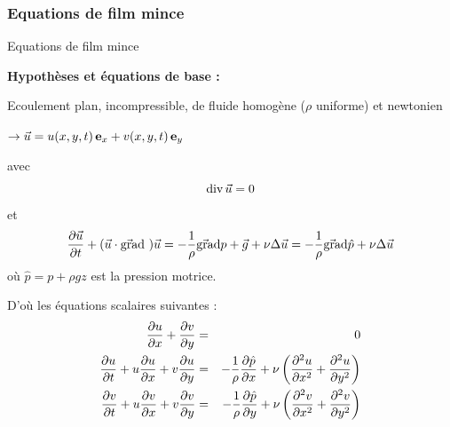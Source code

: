 \subsubsection{Equations de film mince}
\begin{frame}{Equations de film mince}

\small

\textbf{Hypothèses et équations de base :} \medskip

Ecoulement plan, incompressible, de fluide homogène ($\rho$ uniforme) et newtonien

\medskip \pause

$\rightarrow \vec{u} = u(x, y, t) \, \mathbf{e}_{x} + v(x, y, t)\, \mathbf{e}_{y}$

\medskip

avec 
\[
	\mbox{\rm div}\, \vec{u} = 0
\] 
et 
\[
	\displaystyle \frac{\partial \vec{u}}{\partial t} +(\vec{u}\cdot\vec{\mbox{\rm gra}}\mbox{\rm d}\ ) \vec{u} 
	= 
	-\frac{1}{\rho} \vec{\mbox{\rm gra}}\mbox{\rm d} p + \vec{g} + \nu \Delta\vec{u}
	=
	-\frac{1}{\rho} \vec{\mbox{\rm gra}}\mbox{\rm d} \hat{p} + \nu \Delta\vec{u}	
\]
où $\hat{p} = p + \rho g z$ est la pression motrice.

\bigskip

\pause

D'où les équations scalaires suivantes :
\begin{eqnarray}
	\dpdx{u} + \dpdy{v} 
	\label{eq:continuite}
	& = & 
	0
	\\
	\dpdt{u} + u\dpdx{u} + v\dpdy{u}  
	& = & 
	-\frac{1}{\rho} \dpdx{\hat{p}} + \nu \left ( \ddpdx{u} + \ddpdy{u} \right )
	\label{eq:qdmx}
	\\
	\dpdt{v} + u\dpdx{v} + v\dpdy{v}  
	& = & 
	-\frac{1}{\rho} \dpdy{\hat{p}} + \nu \left ( \ddpdx{v} + \ddpdy{v} \right )
	\label{eq:qdmy}
\end{eqnarray}

\small

\vspace{5mm}

\end{frame}

